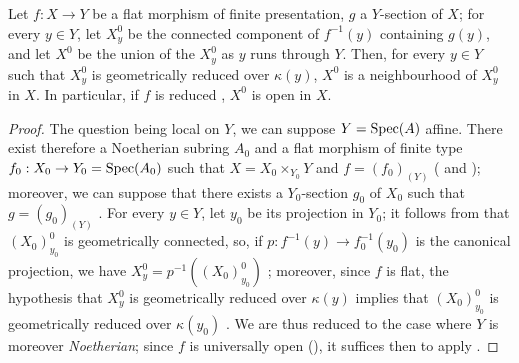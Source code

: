 \begin{corollary}[15.6.5]
\label{IV.15.6.5}
Let $f:X\to Y$ be a flat morphism of finite presentation, $g$ a $Y$-section of $X$; for every $y\in Y$, let $X_y^0$ be the connected component of $f^{-1}(y)$ containing $g(y)$, and let $X^0$ be the union of the $X_y^0$ as $y$ runs through $Y$.
Then, for every $y\in Y$ such that $X_y^0$ is geometrically reduced over $\kappa(y)$, $X^0$ is a neighbourhood of $X_y^0$ in $X$.
In particular, if $f$ is reduced , $X^0$ is open in $X$.
\end{corollary}

\begin{proof}
The question being local on $Y$, we can suppose $Y=\operatorname{Spec}(A)$ affine.
There exist therefore a Noetherian subring $A_0$ and a flat morphism of finite type $f_0:X_0\to Y_0=\operatorname{Spec}(A_0)$ such that $X=X_0\times_{Y_0}Y$ and $f=(f_0)_{(Y)}$ ( and ); moreover, we can suppose that there exists a $Y_0$-section $g_0$ of $X_0$ such that $g=(g_0)_{(Y)}$ .
For every $y\in Y$, let $y_0$ be its projection in $Y_0$; it follows from  that $(X_0)_{y_0}^0$ is geometrically connected, so, if $p:f^{-1}(y)\to f_0^{-1}(y_0)$ is the canonical projection, we have $X_y^0=p^{-1}((X_0)_{y_0}^0)$ ; moreover, since $f$ is flat, the hypothesis that $X_y^0$ is geometrically reduced over $\kappa(y)$ implies that $(X_0)_{y_0}^0$ is geometrically reduced over $\kappa(y_0)$ .
We are thus reduced to the case where
$Y$ is moreover \emph{Noetherian}; since $f$ is universally open (), it suffices then to apply .
\end{proof}

